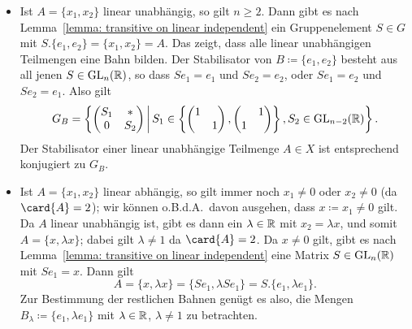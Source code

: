 \begin{itemize}
  \item
    Ist $A = \{x_1, x_2\}$ linear unabhängig, so gilt $n \geq 2$.
    Dann gibt es nach Lemma~\ref{lemma: transitive on linear independent} ein Gruppenelement $S \in G$ mit $S.\{e_1, e_2\} = \{x_1, x_2\} = A$.
    Das zeigt, dass alle linear unabhängigen Teilmengen eine Bahn bilden.
    Der Stabilisator von $B \coloneqq \{e_1, e_2\}$ besteht aus all jenen $S \in \operatorname{GL}_{n}(\mathbb{R})$, so dass $Se_1 = e_1$ und $Se_2 = e_2$, oder $Se_1 = e_2$ und $Se_2 = e_1$.
    Also gilt
    \[
        G_B
      = \left\{
          \begin{pmatrix}
            S_1 & *   \\
            0   & S_2
          \end{pmatrix}
          \suchthat*
              S_1
          \in \left\{
                \begin{pmatrix}
                  1 &   \\
                    & 1
                \end{pmatrix},
                \begin{pmatrix}
                    & 1 \\
                  1 &
                \end{pmatrix}
              \right\},
              S_2
          \in \GL{n-2}{\Real}
        \right\}.
    \]
    Der Stabilisator einer linear unabhängige Teilmenge $A \in X$ ist entsprechend konjugiert zu $G_B$.
  \item
    Ist $A = \{x_1, x_2\}$ linear abhängig, so gilt immer noch $x_1 \neq 0$ oder $x_2 \neq 0$ (da $\card{A} = 2$);
    wir können o.B.d.A.\ davon ausgehen, dass $x \coloneqq x_1 \neq 0$ gilt.
    Da $A$ linear unabhängig ist, gibt es dann ein $\lambda \in \mathbb{R}$ mit $x_2 = \lambda x$, und somit $A = \{x, \lambda x\}$;
    dabei gilt  $\lambda \neq 1$ da $\card{A} = 2$.
    Da $x \neq 0$ gilt, gibt es nach Lemma~\ref{lemma: transitive on linear independent} eine Matrix $S \in \operatorname{GL}_{n}(\mathbb{R})$ mit $Se_1 = x$.
    Dann gilt
    \[
        A
      = \{ x, \lambda x \}
      = \{ Se_1, \lambda Se_1 \}
      = S.\{ e_1, \lambda e_1 \}.
    \]
    Zur Bestimmung der restlichen Bahnen genügt es also, die Mengen $B_\lambda \coloneqq \{e_1, \lambda e_1\}$ mit $\lambda \in \mathbb{R}$, $\lambda \neq 1$ zu betrachten.
    

\end{itemize}
